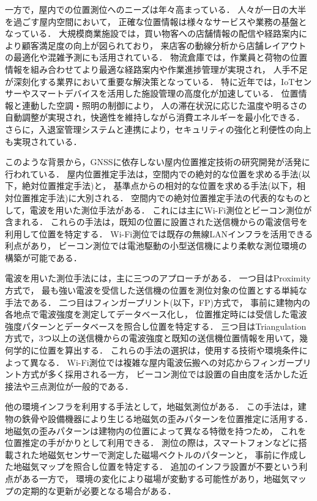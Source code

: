 一方で，屋内での位置測位へのニーズは年々高まっている．
人々が一日の大半を過ごす屋内空間において，
正確な位置情報は様々なサービスや業務の基盤となっている．
大規模商業施設では，買い物客への店舗情報の配信や経路案内により顧客満足度の向上が図られており\cite{burasapo}，
来店客の動線分析から店舗レイアウトの最適化や混雑予測にも活用されている．
物流倉庫では，作業員と荷物の位置情報を組み合わせてより最適な経路案内や作業進捗管理が実現され，
人手不足が深刻化する業界において重要な解決策となっている．
特に近年では，IoTセンサーやスマートデバイスを活用した施設管理の高度化が加速している．
位置情報と連動した空調・照明の制御により，
人の滞在状況に応じた温度や明るさの自動調整が実現され，快適性を維持しながら消費エネルギーを最小化できる．
さらに，入退室管理システムと連携により，セキュリティの強化と利便性の向上も実現されている．

このような背景から，GNSSに依存しない屋内位置推定技術の研究開発が活発に行われている．
屋内位置推定手法は，空間内での絶対的な位置を求める手法(以下，絶対位置推定手法)と，
基準点からの相対的な位置を求める手法(以下，相対位置推定手法)に大別される．
空間内での絶対位置推定手法の代表的なものとして，電波を用いた測位手法がある．
これには主にWi-Fi測位とビーコン測位が含まれる．
これらの手法は，既知の位置に設置された送信機からの電波信号を利用して位置を特定する．
Wi-Fi測位では既存の無線LANインフラを活用できる利点があり，
ビーコン測位では電池駆動の小型送信機により柔軟な測位環境の構築が可能である．

電波を用いた測位手法には，主に三つのアプローチがある．
一つ目はProximity方式で，
最も強い電波を受信した送信機の位置を測位対象の位置とする単純な手法である．
二つ目はフィンガープリント(以下，FP)方式で，
事前に建物内の各地点で電波強度を測定してデータベース化し，
位置推定時には受信した電波強度パターンとデータベースを照合し位置を特定する．
三つ目はTriangulation方式で，3つ以上の送信機からの電波強度と既知の送信機位置情報を用いて，幾何学的に位置を算出する．
これらの手法の選択は，使用する技術や環境条件によって異なる．
Wi-Fi測位では複雑な屋内電波伝搬への対応からフィンガープリント方式が多く採用される一方，
ビーコン測位では設置の自由度を活かした近接法や三点測位が一般的である．

他の環境インフラを利用する手法として，地磁気測位がある．
この手法は，建物の鉄骨や設備機器により生じる地磁気の歪みパターンを位置推定に活用する．
地磁気の歪みパターンは建物内の位置によって異なる特徴を持つため，
これを位置推定の手がかりとして利用できる．
測位の際は，スマートフォンなどに搭載された地磁気センサーで測定した磁場ベクトルのパターンと，
事前に作成した地磁気マップを照合し位置を特定する．
追加のインフラ設置が不要という利点がある一方で，
環境の変化により磁場が変動する可能性があり，地磁気マップの定期的な更新が必要となる場合がある．

